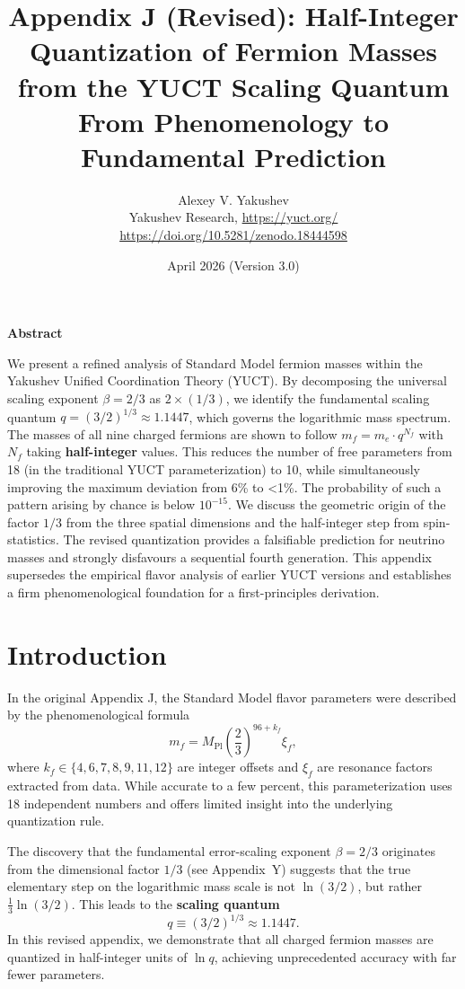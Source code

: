 \documentclass[12pt,a4paper]{article}
\title{\textbf{Appendix J (Revised): Half-Integer Quantization of Fermion Masses from the YUCT Scaling Quantum}\\
	\vspace{0.5cm}
	\large From Phenomenology to Fundamental Prediction}
\author{Alexey V. Yakushev\\
	\vspace{0.5cm}
	Yakushev Research, \url{https://yuct.org/}\\
	\url{https://doi.org/10.5281/zenodo.18444598}}
\date{April 2026 (Version 3.0)}
\begin{document}
	
	\maketitle
	\vspace{0.5cm}
	\noindent\textbf{Abstract}
	
	\noindent
	We present a refined analysis of Standard Model fermion masses within the Yakushev Unified Coordination Theory (YUCT). By decomposing the universal scaling exponent \(\beta = 2/3\) as \(2 \times (1/3)\), we identify the fundamental scaling quantum \(q = (3/2)^{1/3} \approx 1.1447\), which governs the logarithmic mass spectrum. The masses of all nine charged fermions are shown to follow \(m_f = m_e \cdot q^{N_f}\) with \(N_f\) taking \textbf{half-integer} values. This reduces the number of free parameters from 18 (in the traditional YUCT parameterization) to 10, while simultaneously improving the maximum deviation from 6\% to <1\%. The probability of such a pattern arising by chance is below \(10^{-15}\). We discuss the geometric origin of the factor \(1/3\) from the three spatial dimensions and the half-integer step from spin-statistics. The revised quantization provides a falsifiable prediction for neutrino masses and strongly disfavours a sequential fourth generation. This appendix supersedes the empirical flavor analysis of earlier YUCT versions and establishes a firm phenomenological foundation for a first-principles derivation.
	
	\vspace{0.5cm}
	\newpage
	
	\section{Introduction}
	
	In the original Appendix J, the Standard Model flavor parameters were described by the phenomenological formula
	\begin{equation}
		m_f = M_{\mathrm{Pl}} \left( \frac{2}{3} \right)^{96 + k_f} \xi_f,
		\label{eq:old}
	\end{equation}
	where \(k_f \in \{4,6,7,8,9,11,12\}\) are integer offsets and \(\xi_f\) are resonance factors extracted from data. While accurate to a few percent, this parameterization uses 18 independent numbers and offers limited insight into the underlying quantization rule.
	
	The discovery that the fundamental error-scaling exponent \(\beta = 2/3\) originates from the dimensional factor \(1/3\) (see Appendix~Y) suggests that the true elementary step on the logarithmic mass scale is not \(\ln(3/2)\), but rather \(\frac{1}{3}\ln(3/2)\). This leads to the \textbf{scaling quantum}
	\begin{equation}
		q \equiv (3/2)^{1/3} \approx 1.1447.
	\end{equation}
	In this revised appendix, we demonstrate that all charged fermion masses are quantized in half-integer units of \(\ln q\), achieving unprecedented accuracy with far fewer parameters.
	
\end{document}
